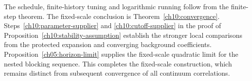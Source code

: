 The schedule,
finite-history tuning and logarithmic running follow from the finite-step theorem. The fixed-scale conclusion is
Theorem~\ref{ch10:convergence}. Steps~\ref{ch10:parameter-supplier} and
\ref{ch10:cutoff-supplier} in the proof of Proposition~\ref{ch10:stability-assumption}
establish the stronger local comparisons
from the protected expansion and converging background coefficients.
Proposition~\ref{ch05:horizon-limit} supplies the fixed-scale quadratic
limit for the nested blocking sequence. This completes the fixed-scale
construction, which remains distinct from subsequent convergence of
all continuum correlations.
